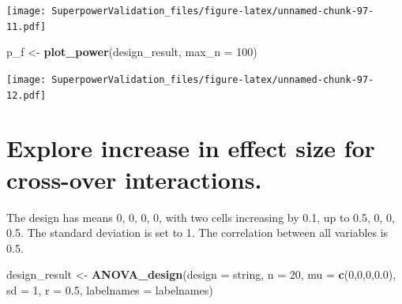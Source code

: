 \documentclass[]{book}
\newenvironment{Shaded}{\begin{snugshade}}{\end{snugshade}}
\newcommand{\CommentTok}[1]{\textcolor[rgb]{0.56,0.35,0.01}{\textit{#1}}}
\newcommand{\DataTypeTok}[1]{\textcolor[rgb]{0.13,0.29,0.53}{#1}}
\newcommand{\DecValTok}[1]{\textcolor[rgb]{0.00,0.00,0.81}{#1}}
\newcommand{\FloatTok}[1]{\textcolor[rgb]{0.00,0.00,0.81}{#1}}
\newcommand{\KeywordTok}[1]{\textcolor[rgb]{0.13,0.29,0.53}{\textbf{#1}}}
\newcommand{\NormalTok}[1]{#1}
\newcommand{\StringTok}[1]{\textcolor[rgb]{0.31,0.60,0.02}{#1}}
\begin{document}
\texttt{[image: SuperpowerValidation\_files/figure-latex/unnamed-chunk-97-11.pdf]}

\begin{Shaded}
\begin{Highlighting}[]
\NormalTok{p_f <-}\StringTok{ }\KeywordTok{plot_power}\NormalTok{(design_result,}
                      \DataTypeTok{max_n =} \DecValTok{100}\NormalTok{)}
\end{Highlighting}
\end{Shaded}

\texttt{[image: SuperpowerValidation\_files/figure-latex/unnamed-chunk-97-12.pdf]}

\begin{Shaded}
\end{Shaded}

\hypertarget{explore-increase-in-effect-size-for-cross-over-interactions.}{%
\section{Explore increase in effect size for cross-over interactions.}\label{explore-increase-in-effect-size-for-cross-over-interactions.}}

The design has means 0, 0, 0, 0, with two cells increasing by 0.1, up to 0.5, 0, 0, 0.5. The standard deviation is set to 1. The correlation between all variables is 0.5.

\begin{Shaded}
\begin{Highlighting}[]
\NormalTok{design_result <-}\StringTok{ }\KeywordTok{ANOVA_design}\NormalTok{(}\DataTypeTok{design =}\NormalTok{ string,}
                              \DataTypeTok{n =} \DecValTok{20}\NormalTok{, }
                              \DataTypeTok{mu =} \KeywordTok{c}\NormalTok{(}\DecValTok{0}\NormalTok{,}\DecValTok{0}\NormalTok{,}\DecValTok{0}\NormalTok{,}\FloatTok{0.0}\NormalTok{), }
                              \DataTypeTok{sd =} \DecValTok{1}\NormalTok{, }
                              \DataTypeTok{r =} \FloatTok{0.5}\NormalTok{, }
                              \DataTypeTok{labelnames =}\NormalTok{ labelnames)}
\end{Highlighting}
\end{Shaded}
\end{document}
